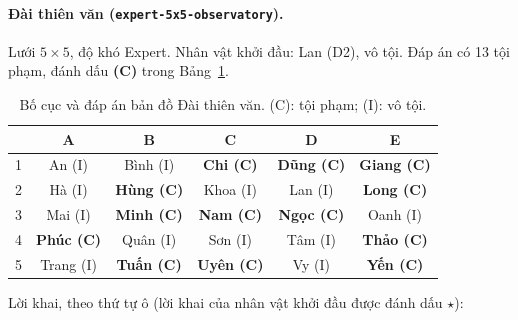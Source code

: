 \paragraph{Đài thiên văn (\texttt{expert-5x5-observatory}).}
Lưới $5\times5$, độ khó Expert. Nhân vật khởi đầu: Lan (D2), vô tội. Đáp án có 13 tội phạm, đánh dấu \textbf{(C)} trong Bảng~\ref{tab:map_observatory}.
\begin{table}[htbp]
  \centering\small
  \caption{Bố cục và đáp án bản đồ Đài thiên văn. (C): tội phạm; (I): vô tội.}
  \label{tab:map_observatory}
  \begin{tabular}{cccccc}
    \toprule
    & A & B & C & D & E \\
    \midrule
    1 & An (I) & Bình (I) & \textbf{Chi (C)} & \textbf{Dũng (C)} & \textbf{Giang (C)} \\
    2 & Hà (I) & \textbf{Hùng (C)} & Khoa (I) & Lan (I) & \textbf{Long (C)} \\
    3 & Mai (I) & \textbf{Minh (C)} & \textbf{Nam (C)} & \textbf{Ngọc (C)} & Oanh (I) \\
    4 & \textbf{Phúc (C)} & Quân (I) & Sơn (I) & Tâm (I) & \textbf{Thảo (C)} \\
    5 & Trang (I) & \textbf{Tuấn (C)} & \textbf{Uyên (C)} & Vy (I) & \textbf{Yến (C)} \\
    \bottomrule
  \end{tabular}
\end{table}
\noindent Lời khai, theo thứ tự ô (lời khai của nhân vật khởi đầu được đánh dấu $\star$):

